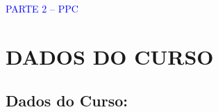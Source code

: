 \documentclass{../../modelos/latex-shared/ifsc-ppc}
\newcommand{\revisao}[1]{\textcolor{blue}{#1}}
\newcommand{\revisao}[1]{#1}
\begin{document}
\clearpage
\begin{center}
{\fontsize{18pt}{22pt}\selectfont\revisao{PARTE 2 -- PPC}}
\end{center}
\vspace{0.5\baselineskip}

\section{DADOS DO CURSO}
\subsection{Dados do Curso:}

\renewcommand{\tablename}{Quadro}
\end{document}
